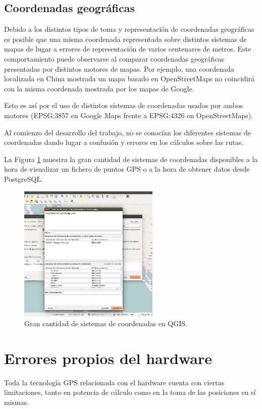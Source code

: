 \subsection{Coordenadas geográficas}
Debido a los distintos tipos de toma y representación de coordenadas geográficas es posible que una misma coordenada representada sobre distintos sistemas de mapas de lugar a errores de representación de varios centenares de metros. Este comportamiento puede observarse al comparar coordenadas geográficas presentadas por distintos motores de mapas. Por ejemplo, una coordenada localizada en China mostrada un mapa basado en OpenStreetMaps no coincidirá con la misma coordenada mostrada por los mapas de Google.

Esto es así por el uso de distintos sistemas de coordenadas usados por ambos motores (EPSG:3857 en Google Maps frente a EPSG:4326 en OpenStreetMaps).

Al comienzo del desarrollo del trabajo, no se conocían los diferentes sistemas de coordenadas dando lugar a confusión y errores en los cálculos sobre las rutas.

La Figura \ref{coordenadas} muestra la gran cantidad de sistemas de coordenadas disponibles a la hora de visualizar un fichero de puntos GPS o a la hora de obtener datos desde PostgreSQL.


\begin{figure}[h]
  \centering
    \includegraphics[width=0.6\textwidth]{../img/poi/qgis.jpg}
  \caption{Gran cantidad de sistemas de coordenadas en QGIS.}
  \label{coordenadas}
\end{figure}

\section{Errores propios del hardware}
Toda la tecnología GPS relacionada con el hardware cuenta con ciertas limitaciones, tanto en potencia de cálculo como en la toma de las posiciones en sí mismas.


